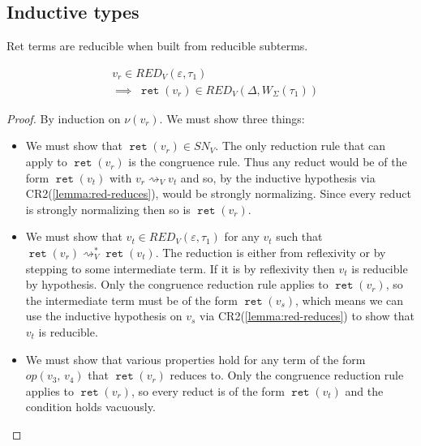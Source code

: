 \documentclass[acmsmall, screen, review, anonymous]{acmart}
\theoremstyle{definition}
\newcommand{\ind}[1]{W_{#1}}
\newcommand{\indintro}[3]{{#1}(#2,\, #3)}
\newcommand{\retname}{\mathtt{ret}}
\newcommand{\ret}[1]{\mathop{\retname}(#1)}
\newcommand{\cempty}{\varepsilon}
\newcommand{\stepstoname}{\rightsquigarrow}
\newcommand{\stepstov}{\stepstoname_V}
\newcommand{\reducestoname}{\stepstoname^{*}}
\newcommand{\reducestov}{\reducestoname_{V}}
\newcommand{\snv}{SN_V}
\newcommand{\bound}[1]{\nu(#1)}
\newcommand{\redname}{RED}
\newcommand{\redvname}{\redname_{V}}
\newcommand{\redv}[2]{\redvname{({#1},{#2})}}
\begin{document}
\subsection{Inductive types}

Ret terms are reducible when built from reducible subterms.
\begin{lemma}
\label{lemma:red-ret}
\begin{align*}
  &v_r \in \redv{\cempty}{\tau_1} \\
  &\implies \; \ret{v_r} \in \redv{\Delta}{\ind{\Sigma}(\tau_1)}
\end{align*}
\end{lemma}
\begin{proof}
  By induction on $\bound{v_r}$. We must show three things:
  \begin{itemize}
  \item We must show that $\ret{v_r} \in \snv$. The only reduction rule
    that can apply to $\ret{v_r}$ is the congruence rule. Thus any
    reduct would be of the form $\ret{v_t}$ with $v_r \stepstov v_t$ and
    so, by the inductive hypothesis via CR2(\ref{lemma:red-reduces}),
    would be strongly normalizing. Since every reduct is strongly
    normalizing then so is $\ret{v_r}$.
  \item We must show that $v_t \in \redv{\cempty}{\tau_1}$ for any $v_t$
    such that $\ret{v_r} \reducestov \ret{v_t}$. The reduction is either
    from reflexivity or by stepping to some intermediate term. If it is
    by reflexivity then $v_t$ is reducible by hypothesis. Only the
    congruence reduction rule applies to $\ret{v_r}$, so the
    intermediate term must be of the form $\ret{v_s}$, which means we
    can use the inductive hypothesis on $v_s$ via
    CR2(\ref{lemma:red-reduces}) to show that $v_t$ is reducible.
  \item We must show that various properties hold for any term of the
    form $\indintro{op}{v_3}{v_4}$ that $\ret{v_r}$ reduces to. Only the
    congruence reduction rule applies to $\ret{v_r}$, so every reduct is
    of the form $\ret{v_t}$ and the condition holds vacuously.
  \end{itemize}
\end{proof}
\end{document}
